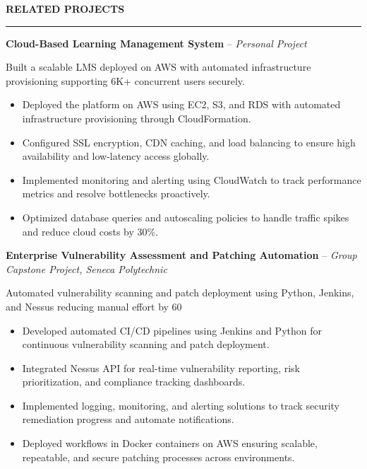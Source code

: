 \documentclass[10pt,letterpaper]{article}
\begin{document}
\vspace{6pt}

\textbf{RELATED PROJECTS}\\[-8pt]
\noindent\rule{\textwidth}{1pt}

\vspace{-2pt}

\textbf{Cloud-Based Learning Management System} -- \emph{Personal Project}

\vspace{-1pt}

Built a scalable LMS deployed on AWS with automated infrastructure provisioning supporting 6K+ concurrent users securely.
\vspace{-1pt}
\begin{itemize}
\item Deployed the platform on AWS using EC2, S3, and RDS with automated infrastructure provisioning through CloudFormation.
\item Configured SSL encryption, CDN caching, and load balancing to ensure high availability and low-latency access globally.
\item Implemented monitoring and alerting using CloudWatch to track performance metrics and resolve bottlenecks proactively.
\item Optimized database queries and autoscaling policies to handle traffic spikes and reduce cloud costs by 30\%.
\end{itemize}

\textbf{Enterprise Vulnerability Assessment and Patching Automation} -- \emph{Group Capstone Project, Seneca Polytechnic}

\vspace{-1pt}

Automated vulnerability scanning and patch deployment using Python, Jenkins, and Nessus reducing manual effort by 60%
\vspace{-1pt}
\begin{itemize}
\item Developed automated CI/CD pipelines using Jenkins and Python for continuous vulnerability scanning and patch deployment.
\item Integrated Nessus API for real-time vulnerability reporting, risk prioritization, and compliance tracking dashboards.
\item Implemented logging, monitoring, and alerting solutions to track security remediation progress and automate notifications.
\item Deployed workflows in Docker containers on AWS ensuring scalable, repeatable, and secure patching processes across environments.
\end{itemize}
\end{document}
